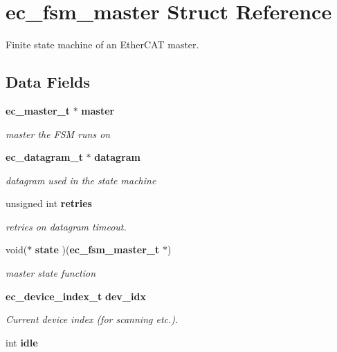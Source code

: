 \section{ec\-\_\-fsm\-\_\-master Struct Reference}
\label{structec__fsm__master}


Finite state machine of an Ether\-C\-A\-T master.  


\subsection*{Data Fields}
\begin{DoxyCompactItemize}
\item 
{\bf ec\-\_\-master\-\_\-t} $\ast$ {\bf master}\label{structec__fsm__master_af5597239477f215c744aad387d7baa6b}

\begin{DoxyCompactList}\small\item\em master the F\-S\-M runs on \end{DoxyCompactList}\item 
{\bf ec\-\_\-datagram\-\_\-t} $\ast$ {\bf datagram}\label{structec__fsm__master_a518334a40bb6eeea55081a997bbaebc2}

\begin{DoxyCompactList}\small\item\em datagram used in the state machine \end{DoxyCompactList}\item 
unsigned int {\bf retries}
\begin{DoxyCompactList}\small\item\em retries on datagram timeout. \end{DoxyCompactList}\item 
void($\ast$ {\bf state} )({\bf ec\-\_\-fsm\-\_\-master\-\_\-t} $\ast$)\label{structec__fsm__master_a604e1597e8447699b14b5fa8298980a6}

\begin{DoxyCompactList}\small\item\em master state function \end{DoxyCompactList}\item 
{\bf ec\-\_\-device\-\_\-index\-\_\-t} {\bf dev\-\_\-idx}\label{structec__fsm__master_ab57f14b0c615bae6428ff89ef2cb7ef0}

\begin{DoxyCompactList}\small\item\em Current device index (for scanning etc.). \end{DoxyCompactList}\item 
int {\bf idle}\label{structec__fsm__master_aa06626b21389030366d7aed5f525c6c0}


\end{DoxyCompactItemize}
